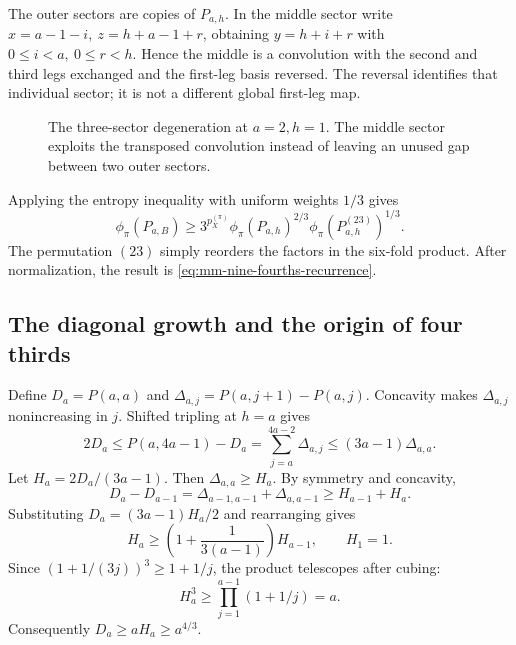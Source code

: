 The outer sectors are copies of \(P_{a,h}\). In the middle sector write \(x=a-1-i,\ z=h+a-1+r\), obtaining \(y=h+i+r\) with \(0\leq i<a,\ 0\leq r<h\). Hence the middle is a convolution with the second and third legs exchanged and the first-leg basis reversed. The reversal identifies that individual sector; it is not a different global first-leg map.

\begin{figure}[htbp]
\centering
{}
\caption{The three-sector degeneration at \(a=2,h=1\). The middle sector exploits the transposed convolution instead of leaving an unused gap between two outer sectors.}
\end{figure}

Applying the entropy inequality with uniform weights \(1/3\) gives
\[
 \phi_\pi(P_{a,B})\geq3^{p_X^{(\pi)}}
 \phi_\pi(P_{a,h})^{2/3}\phi_\pi(P_{a,h}^{(23)})^{1/3}.
\]
The permutation \((23)\) simply reorders the factors in the six-fold product. After normalization, the result is \eqref{eq:mm-nine-fourths-recurrence}.

\subsection{The diagonal growth and the origin of four thirds}

Define \(D_a=P(a,a)\) and \(\Delta_{a,j}=P(a,j+1)-P(a,j)\). Concavity makes \(\Delta_{a,j}\) nonincreasing in \(j\). Shifted tripling at \(h=a\) gives
\[
 2D_a\leq P(a,4a-1)-D_a
   =\sum_{j=a}^{4a-2}\Delta_{a,j}
   \leq(3a-1)\Delta_{a,a}.
\]
Let \(H_a=2D_a/(3a-1)\). Then \(\Delta_{a,a}\geq H_a\). By symmetry and concavity,
\[
 D_a-D_{a-1}=\Delta_{a-1,a-1}+\Delta_{a,a-1}
 \geq H_{a-1}+H_a.
\]
Substituting \(D_a=(3a-1)H_a/2\) and rearranging gives
\[
 H_a\geq\left(1+\frac{1}{3(a-1)}\right)H_{a-1},
 \qquad H_1=1.
\]
Since \((1+1/(3j))^3\geq1+1/j\), the product telescopes after cubing:
\[
 H_a^3\geq\prod_{j=1}^{a-1}(1+1/j)=a.
\]
Consequently \(D_a\geq aH_a\geq a^{4/3}\).

